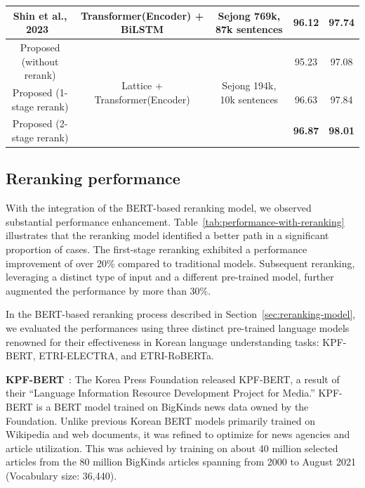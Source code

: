 \documentclass[AMS,STIX2COL]{WileyNJD-v2}
\begin{document}
\begin{table}[ht]
\begin{tabular*}{500pt}{@{\extracolsep\fill}ccc|cc@{\extracolsep\fill}}
            Shin et al., 2023~\cite{ShinHJ2023}   & Transformer(Encoder) + BiLSTM                   & Sejong 769k, 87k sentences                  & 96.12                      & 97.74                        \\
            \midrule
            Proposed (without rerank)             & \multirow{3}{*}{Lattice + Transformer(Encoder)} & \multirow{3}{*}{Sejong 194k, 10k sentences} & 95.23                      & 97.08                        \\
            Proposed (1-stage rerank)             & ~                                               & ~                                           & 96.63                      & 97.84                        \\
            Proposed (2-stage rerank)             & ~                                               & ~                                           & \textbf{96.87}             & \textbf{98.01}               \\
            \bottomrule
        \end{tabular*}
    \end{table}

    \subsection{Reranking performance}\label{subsec:reranking-performance}

    With the integration of the BERT-based reranking model, we observed substantial performance enhancement.
    Table~\ref{tab:performance-with-reranking} illustrates that the reranking model identified a better path in a significant proportion of cases.
    The first-stage reranking exhibited a performance improvement of over 20\% compared to traditional models.
    Subsequent reranking, leveraging a distinct type of input and a different pre-trained model, further augmented the performance by more than 30\%.

    In the BERT-based reranking process described in Section~\ref{sec:reranking-model}, we evaluated the performances using three distinct pre-trained language models renowned for their effectiveness in Korean language understanding tasks: KPF-BERT, ETRI-ELECTRA, and ETRI-RoBERTa.

    \textbf{KPF-BERT}~\cite{KPF_BERT}: The Korea Press Foundation released KPF-BERT, a result of their ``Language Information Resource Development Project for Media.''
    KPF-BERT is a BERT model trained on BigKinds news data owned by the Foundation.
    Unlike previous Korean BERT models primarily trained on Wikipedia and web documents, it was refined to optimize for news agencies and article utilization.
    This was achieved by training on about 40 million selected articles from the 80 million BigKinds articles spanning from 2000 to August 2021 (Vocabulary size: 36,440).
\end{document}
